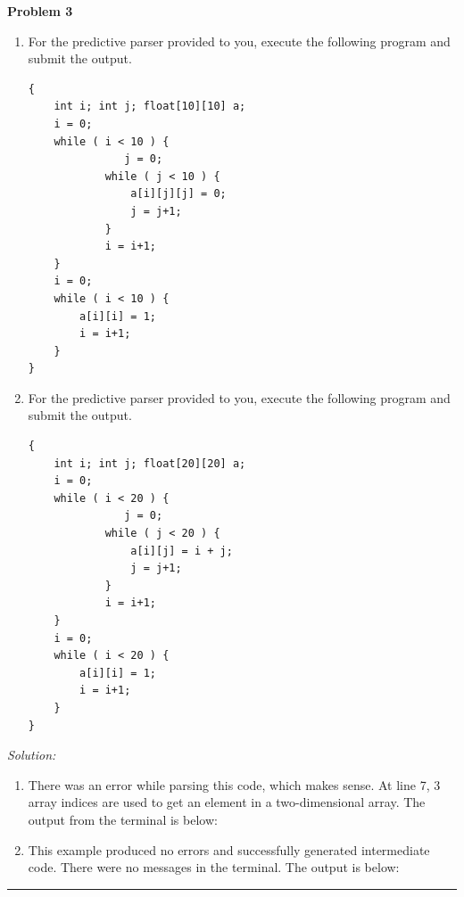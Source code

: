 \documentclass[a4paper, 11pt]{article}
\newenvironment{problem}[2][Problem]
    { \begin{mdframed}[backgroundcolor=gray!20] \textbf{#1 #2} \\}
    {  \end{mdframed}}
\newenvironment{solution}
    {\textit{Solution:}}
    {}
\begin{document}
\begin{problem}{3}

\begin{enumerate}[a]
    \item For the predictive parser provided to you, execute the following program and submit the output.

          \begin{verbatim}
{
    int i; int j; float[10][10] a;
    i = 0;
    while ( i < 10 ) {
    	       j = 0;
            while ( j < 10 ) {
                a[i][j][j] = 0;
                j = j+1;
            }
            i = i+1;
    }
    i = 0;
    while ( i < 10 ) {
        a[i][i] = 1;
        i = i+1;
    }
}
\end{verbatim}

    \item For the predictive parser provided to you, execute the following program and submit the output.
          \begin{verbatim}
{
    int i; int j; float[20][20] a;
    i = 0;
    while ( i < 20 ) {
    	       j = 0;
            while ( j < 20 ) {
                a[i][j] = i + j;
                j = j+1;
            }
            i = i+1;
    }
    i = 0;
    while ( i < 20 ) {
        a[i][i] = 1;
        i = i+1;
    }
}
\end{verbatim}
\end{enumerate}
\end{problem}

\begin{solution}
    \begin{enumerate}[a]
        \item There was an error while parsing this code, which makes sense. At line 7, 3 array indices are used to get an element in a two-dimensional array. The output from the terminal is below:

              

        \item This example produced no errors and successfully generated intermediate code. There were no messages in the terminal. The output is below:

              
    \end{enumerate}
\end{solution}
%
\noindent\rule{7in}{2.8pt}
\end{document}
